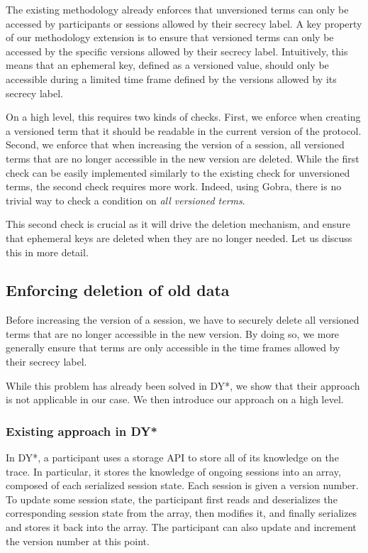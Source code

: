The existing methodology already enforces that unversioned terms can only be accessed by participants or sessions allowed by their secrecy label.
A key property of our methodology extension is to ensure that versioned terms can only be accessed by the specific versions allowed by their secrecy label. Intuitively, this means that an ephemeral key, defined as a versioned value, should only be accessible during a limited time frame defined by the versions allowed by its secrecy label.

On a high level, this requires two kinds of checks.
First, we enforce when creating a versioned term that it should be readable in the current version of the protocol.
Second, we enforce that when increasing the version of a session, all versioned terms that are no longer accessible in the new version are deleted.
While the first check can be easily implemented similarly to the existing check for unversioned terms, the second check requires more work. Indeed, using Gobra, there is no trivial way to check a condition on \emph{all versioned terms}.

This second check is crucial as it will drive the deletion mechanism, and ensure that ephemeral keys are deleted when they are no longer needed. Let us discuss this in more detail.


\subsection{Enforcing deletion of old data}

Before increasing the version of a session, we have to securely delete all versioned terms that are no longer accessible in the new version. By doing so, we more generally ensure that terms are only accessible in the time frames allowed by their secrecy label.

While this problem has already been solved in DY*, we show that their approach is not applicable in our case. We then introduce our approach on a high level.

\subsubsection{Existing approach in DY*}

In DY*, a participant uses a storage API to store all of its knowledge on the trace.
In particular, it stores the knowledge of ongoing sessions into an array, composed of each serialized session state.
Each session is given a version number.
To update some session state, the participant first reads and deserializes the corresponding session state from the array, then modifies it, and finally serializes and stores it back into the array.
The participant can also update and increment the version number at this point.

